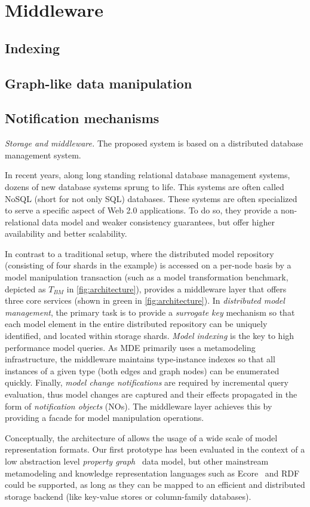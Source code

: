 \section{Middleware}


\subsection{Indexing}


\subsection{Graph-like data manipulation}


\subsection{Notification mechanisms}



\emph{Storage and middleware.}\label{storage_and_middleware}
The proposed system is based on a distributed database management system.

In recent years, along long standing relational database management systems, dozens of new database systems sprung to life. This systems are often called NoSQL (short for not only SQL) databases.
These systems are often specialized to serve a specific aspect of Web 2.0 applications. To do so, they provide a non-relational data model and weaker consistency guarantees, but offer higher availability and better scalability.

In contrast to a traditional setup, where the distributed model repository (consisting of four shards in the example) is accessed on a per-node basis by a model manipulation transaction (such as a model transformation benchmark, depicted as $T_{BM}$ in \autoref{fig:architecture}), \iqd{} provides a middleware layer that offers three core services (shown in green in \autoref{fig:architecture}).
In {{\em distributed model management}}, the primary task is to provide a \emph{surrogate key} mechanism so that each model element in the entire distributed repository can be uniquely identified, and located within storage shards.
{{\em Model indexing}} is the key to high performance model queries. As MDE primarily uses a metamodeling infrastructure, the \iqd{} middleware maintains type-instance indexes so that all instances of a given type (both edges and graph nodes) can be enumerated quickly.
Finally, {{\em model change notifications}} are required by incremental query evaluation, thus model changes are captured and their effects propagated in the form of \emph{notification objects} (NOs). The middleware layer achieves this by providing a facade for model manipulation operations. 

Conceptually, the architecture of \iqd{} allows the usage of a wide scale of model representation formats. Our first prototype has been evaluated in the context of a low abstraction level \emph{property graph}~\cite{DBLP:journals/corr/abs-1006-2361} data model, but other mainstream metamodeling and knowledge representation languages such as Ecore~\cite{EMF} and RDF~\cite{website:rdf_standard} could be supported, as long as they can be mapped to an efficient and distributed storage backend (like key-value stores or column-family databases).
